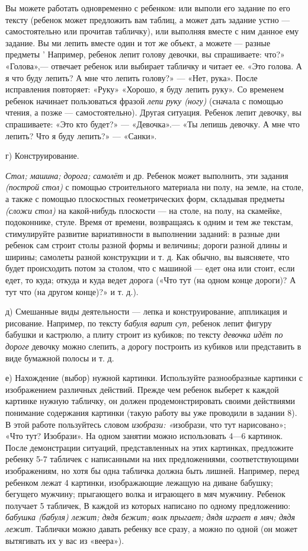 \documentclass{book}
\renewcommand{\emph}[1]{\textit{#1}}
\begin{document}
Вы можете работать одновременно с ребенком: или выполи его задание по
его тексту (ребенок может предложить вам таблиц, а может дать задание
устно --- самостоятельно или прочитав табличку), или выполняя вместе с
ним данное ему задание. Вы ми лепить вместе один и тот же объект, а
можете --- разные предметы ' Например, ребенок лепит голову девочки, вы
спрашиваете: что?» «Голова»,--- отвечает ребенок или выбирает табличку и
читает ее. «Это голова. А я что буду лепить? А мне что лепить голову?»
--- «Нет, рука». После исправления повторяет: «Руку» «Хорошо, я буду
лепить руку». Со временем ребенок начинает пользоваться фразой
\emph{лепи руку (ногу)} (сначала с помощью чтения, а позже ---
самостоятельно). Другая ситуация. Ребенок лепит девочку, вы спрашиваете:
«Это кто будет?» --- «Девочка».--- «Ты лепишь девочку. А мне что лепить?
Что я буду лепить?» --- «Санки».

г) Конструирование.

\emph{Стол; машина; дорога; самолёт} и др. Ребенок может выполнить, эти
задания \emph{(построй стол)} с помощью строительного материала ни полу,
на земле, на столе, а также с помощью плоскостных геометрических форм,
складывая предметы \emph{(сложи стол)} на какой-нибудь плоскости --- на
столе, на полу, на скамейке, подоконнике, стуле. Время от времени,
возвращаясь к одним и тем же текстам, стимулируйте развитие
вариативности в выполнении заданий: в разные дни ребенок сам строит
столы разной формы и величины; дороги разной длины и ширины; самолеты
разной конструкции и т. д. Как обычно, вы выясняете, что будет
происходить потом за столом, что с машиной --- едет она или стоит, если
едет, то куда; откуда и куда ведет дорога («Что тут (на одном конце
дороги)? А тут что (на другом конце)?» и т. д.).

д) Смешанные виды деятельности --- лепка и конструирование, аппликация и
рисование. Например, по тексту \emph{бабуля варит суп,} ребенок лепит
фигуру бабушки и кастрюлю, а плиту строит из кубиков; по тексту
\emph{девочка идёт по дороге} девочку можно слепить, а дорогу построить
из кубиков или представить в виде бумажной полосы и т. д.

е) Нахождение (выбор) нужной картинки. Используйте разнообразные
картинки с изображением различных действий. Прежде чем ребенок выберет к
каждой картинке нужную табличку, он должен продемонстрировать своими
действиями понимание содержания картинки (такую работу вы уже проводили
в задании 8). В этой работе пользуйтесь словом \emph{изобрази:
«}изобрази, что тут нарисовано»; «Что тут? Изобрази». На одном занятии
можно использовать 4---6 картинок. После демонстрации ситуаций,
представленных на этих картинках, предложите ребенку 5-7 табличек с
написанными на них предложениями, соответствующими изображениям, но хотя
бы одна табличка должна быть лишней. Например, перед ребенком лежат 4
картинки, изображающие лежащую на диване бабушку; бегущего мужчину;
прыгающего волка и играющего в мяч мужчину. Ребенок получает 5 табличек,
В каждой из которых написано по одному предложению: \emph{бабушка
(бабуля) лежит; дядя бежит; волк прыгает; дядя играет в мяч; дядя
лежит.} Таблички можно давать ребенку все сразу, а можно по одной (он
может вытягивать их у вас из «веера»).
\end{document}
